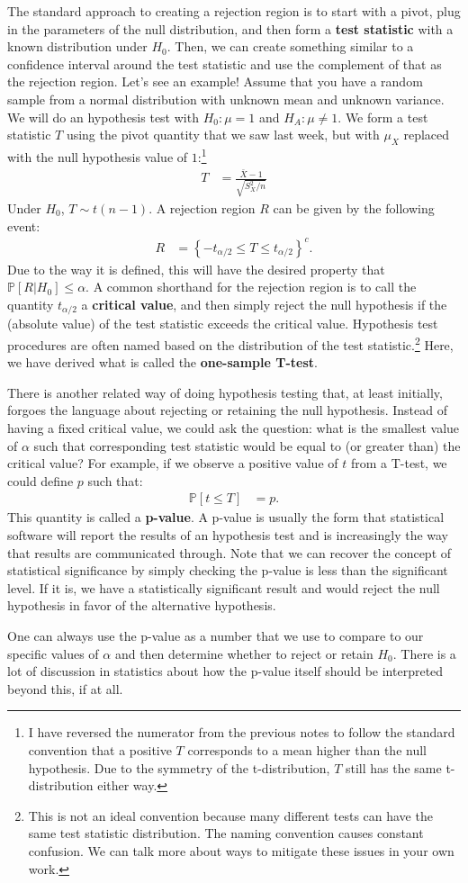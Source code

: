 \documentclass{tufte-handout}
\newcommand{\Prob}{\mathbb{P}}
\begin{document}
The standard approach to creating a rejection region is to start with a
pivot, plug in the parameters of the null distribution, and then form a
\textbf{test statistic} with a known distribution under $H_0$. Then, we
can create something similar to a confidence interval around the test
statistic and use the complement of that as the rejection region. Let's
see an example! Assume that you have a random sample from a normal 
distribution with unknown mean and unknown variance. We will do an 
hypothesis test with $H_0: \mu = 1$ and $H_A: \mu \neq 1$. We form a
test statistic $T$ using the pivot quantity that we saw last week, but
with $\mu_X$ replaced with the null hypothesis value of $1$:\footnote{
  I have reversed the numerator from the previous notes to follow
  the standard convention that a positive $T$ corresponds to a mean
  higher than the null hypothesis. Due to the symmetry of the
  t-distribution, $T$ still has the same t-distribution either way.
}
\begin{align*}
T &= \frac{\bar{X} - 1}{\sqrt{S_X^2 / n}} 
\end{align*}
Under $H_0$, $T \sim t(n-1)$. A rejection region $R$ can be given by
the following event:
\begin{align*}
R &= \left\{ -t_{\alpha/2} \leq T \leq t_{\alpha/2} \right\}^{c}.
\end{align*}
Due to the way it is defined, this will have the desired property that
$\Prob[R|H_0] \leq \alpha$. A common shorthand for the rejection
region is to call the quantity $t_{\alpha/2}$ a \textbf{critical value},
and then simply reject the null hypothesis if the (absolute value) of the
test statistic exceeds the critical value. Hypothesis test procedures
are often named based on the distribution of the test statistic.\footnote{
  This is not an ideal convention because many different tests can have
  the same test statistic distribution. The naming convention causes constant
  confusion. We can talk more about ways to mitigate these issues in your own
  work.
}
Here, we have derived what is called the \textbf{one-sample T-test}. 

\vspace*{20pt}

\noindent
There is another related way of doing hypothesis testing that, at least
initially, forgoes the language about rejecting or retaining the null 
hypothesis. Instead of having a fixed critical value, we could ask the
question: what is the smallest value of $\alpha$ such that corresponding
test statistic would be equal to (or greater than) the critical value? 
For example, if we observe a positive value of $t$ from a T-test, we could
define $p$ such that: 
\begin{align*}
\Prob[t \leq T] &= p. 
\end{align*}
This quantity is called a \textbf{p-value}. A p-value is usually the 
form that statistical software will report the results of an hypothesis
test and is increasingly the way that results are communicated through.
Note that we can recover the concept of statistical significance by 
simply checking the p-value is less than the significant level. If it
is, we have a statistically significant result and would reject the null
hypothesis in favor of the alternative hypothesis.

One can always use the p-value as a number that we use to compare to
our specific values of $\alpha$ and then determine whether to reject
or retain $H_0$. There is a lot of discussion in statistics about how
the p-value itself should be interpreted beyond this, if at all. 
\end{document}
